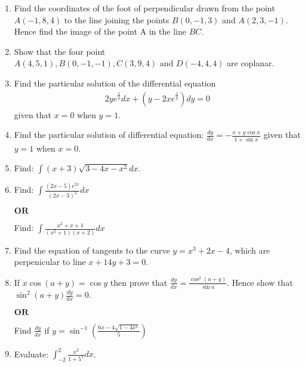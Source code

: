 \documentclass[12pt,-letter paper]{article}
\providecommand{\brak}[1]{\ensuremath{\left(#1\right)}}
\theoremstyle{remark}
\let\vec\mathbf
\begin{document}
\begin{enumerate}
\item Find the coordinates of the foot of perpendicular drawn from the point $A\brak{-1,8,4}$ to the line joining the points $B\brak{0,-1,3}$ and $A\brak{2,3,-1}$. Hence find the image of the point A in the line $BC$.\\

\item Show that the four point $A\brak{4, 5, 1}, B\brak{0,-1,-1}, C\brak{3,9,4} \text{ and } D\brak{-4,4,4}$ are coplanar.\\

\item Find the particular solution of the differential equation
\begin{align*}
2ye^{\frac{x}{y}}dx + \brak{y - 2xe^{\frac{x}{y}}}dy = 0
\end{align*}
given that $x=0$ when $y=1$.\\
\item Find the particular solution of differential equation: $\frac{dy}{dx} = -\frac{x+y\cos{x}}{1+\sin{x}}$ given that $y = 1$ when $x=0$.\\

\item Find: $\int{\brak{x+3}\sqrt{3 - 4x - x^2}dx}$.\\

\item Find: $\int{\frac{(2x - 5)e^{2x}}{(2x-3)^3}dx}$
\begin{center} $\vec{OR}$ \\ \end{center}
Find: $\int{\frac{x^2+x+1}{(x^2+1)(x+2)}dx}$\\

\item Find the equation of tangents to the curve $y=x^3+2x-4$, which are perpenicular to line $x+14y+3=0$.\\

\item If $x\cos(a+y) = \cos{y}$ then prove that $\frac{dy}{dx} = \frac{\cos^2(a+y)}{\sin{a}}$. Hence show that $\sin^2(a+y)\frac{dy}{dx} = 0$.
\begin{center} $\vec{OR}$ \\ \end{center}
Find $\frac{dy}{dx}$ if $y = \sin^{-1}\brak{\frac{6x - 4\sqrt{1-4x^2}}{5}}$\\

\item Evaluate: $\int_{-2}^{2}\frac{x^2}{1+5^x}dx$.\\


\end{enumerate}
\end{document}
